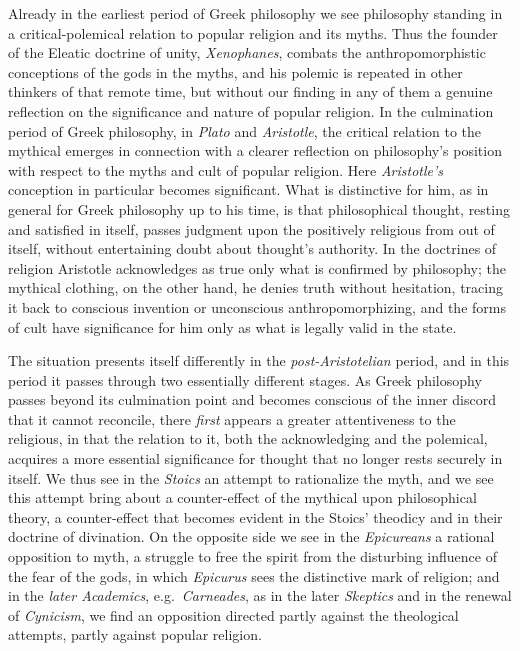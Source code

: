 \documentclass[12pt,a4paper]{book}
\begin{document}
Already in the earliest period of Greek philosophy we see philosophy
standing in a critical-polemical relation to popular religion and its
myths. Thus the founder of the Eleatic doctrine of unity, \emph{Xenophanes},
combats the anthropomorphistic conceptions of the gods in the myths, and
his polemic is repeated in other thinkers of that remote time, but
without our finding in any of them a genuine reflection on the
significance and nature of popular religion. In the culmination period
of Greek philosophy, in \emph{Plato} and \emph{Aristotle}, the critical relation to
the mythical emerges in connection with a clearer reflection on
philosophy's position with respect to the myths and cult of popular
religion. Here \emph{Aristotle's} conception in particular becomes
significant. What is distinctive for him, as in general for Greek
philosophy up to his time, is that philosophical thought, resting and
satisfied in itself, passes judgment upon the positively religious from
out of itself, without entertaining doubt about thought's authority. In
the doctrines of religion Aristotle acknowledges as true only what is
confirmed by philosophy; the mythical clothing, on the other hand, he
denies truth without hesitation, tracing it back to conscious invention
or unconscious anthropomorphizing, and the forms of cult have
significance for him only as what is legally valid in the state.

The situation presents itself differently in the \emph{post-Aristotelian}
period, and in this period it passes through two essentially different
stages. As Greek philosophy passes beyond its culmination point and
becomes conscious of the inner discord that it cannot reconcile, there
\emph{first} appears a greater attentiveness to the religious, in that the
relation to it, both the acknowledging and the polemical, acquires a
more essential significance for thought that no longer rests securely in
itself. We thus see in the \emph{Stoics} an attempt to rationalize the myth,
and we see this attempt bring about a counter-effect of the mythical
upon philosophical theory, a counter-effect that becomes evident in the
Stoics' theodicy and in their doctrine of divination. On the opposite
side we see in the \emph{Epicureans} a rational opposition to myth, a struggle
to free the spirit from the disturbing influence of the fear of the
gods, in which \emph{Epicurus} sees the distinctive mark of religion; and in the \emph{later
Academics}, e.g.\ \emph{Carneades}, as in the later \emph{Skeptics} and in the
renewal of \emph{Cynicism}, we find an opposition directed partly against the
theological attempts, partly against popular religion.
\end{document}
